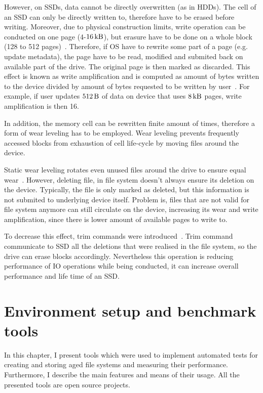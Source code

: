 \documentclass[
  color, %
  table, %
  lof,   %
  lot,   %
]{fithesis3}
\begin{document}
However, on SSDs, data cannot be directly overwritten (as in HDDs). The cell of an SSD can only be directly written to, therefore have to be erased before writing. Moreover, due to physical construction limits, write operation can be conducted on one page (4-$\SI{16}{\kilo\byte}$), but erasure have to be done on a whole block (128 to 512 pages)~\cite{Hu:2009:WAA:1534530.1534544}. Therefore, if OS have to rewrite some part of a page (e.g. update metadata), the page have to be read, modified and submited back on available part of the drive. The original page is then marked as discarded. This effect is known as write amplification and is computed as amount of bytes written to the device divided by amount of bytes requested to be written by user~\cite{Hu:2009:WAA:1534530.1534544}. For example, if user updates $\SI{512}{\byte}$ of data on device that uses $\SI{8}{\kilo\byte}$ pages, write amplification is then 16.

In addition, the memory cell can be rewritten finite amount of times, therefore a form of wear leveling has to be employed. Wear leveling prevents frequently accessed blocks from exhaustion of cell life-cycle by moving files around the device.

Static wear leveling rotates even unused files around the drive to ensure equal wear~\cite{Chang:2007:EEF:1278480.1278533}. However, deleting file, in file system doesn't always ensure its deletion on the device. Typically, the file is only marked as deleted, but this information is not submited to underlying device itself. Problem is, files that are not valid for file system anymore can still circulate on the device, increasing its wear and write amplification, since there is lower amount of available pages to write to.

To decrease this effect, trim commands were introduced~\cite{Frankie:2012:MMT:2184512.2184527}. Trim command communicate to SSD all the deletions that were realised in the file system, so the drive can erase blocks accordingly. Nevertheless this operation is reducing performance of IO operations while being conducted, it can increase overall performance and life time of an SSD.



\chapter{Environment setup and benchmark tools}
\label{tools}
In this chapter, I present tools which were used to implement automated tests for creating and storing aged file systems and measuring their performance. Furthermore, I describe the main features and means of their usage. All the presented tools are open source projects.
\end{document}
